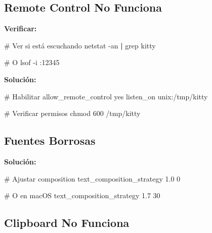 \documentclass[
  doc,
  floatsintext,
  longtable,
  a4paper,
  nolmodern,
  notxfonts,
  notimes,
  12pt,
  colorlinks=true,linkcolor=blue,citecolor=blue,urlcolor=blue]{apa7}
\newenvironment{Shaded}{\begin{snugshade}}{\end{snugshade}}
\newcommand{\AttributeTok}[1]{\textcolor[rgb]{0.40,0.45,0.13}{#1}}
\newcommand{\CommentTok}[1]{\textcolor[rgb]{0.37,0.37,0.37}{#1}}
\newcommand{\DataTypeTok}[1]{\textcolor[rgb]{0.68,0.00,0.00}{#1}}
\newcommand{\ErrorTok}[1]{\textcolor[rgb]{0.68,0.00,0.00}{#1}}
\newcommand{\ExtensionTok}[1]{\textcolor[rgb]{0.00,0.23,0.31}{#1}}
\newcommand{\FunctionTok}[1]{\textcolor[rgb]{0.28,0.35,0.67}{#1}}
\newcommand{\KeywordTok}[1]{\textcolor[rgb]{0.00,0.23,0.31}{\textbf{#1}}}
\newcommand{\NormalTok}[1]{\textcolor[rgb]{0.00,0.23,0.31}{#1}}
\begin{document}
\subsection{Remote Control No
Funciona}\label{remote-control-no-funciona}

\textbf{Verificar:}

\begin{Shaded}
\begin{Highlighting}[]
\CommentTok{\# Ver si está escuchando}
\FunctionTok{netstat} \AttributeTok{{-}an} \KeywordTok{|} \FunctionTok{grep}\NormalTok{ kitty}

\CommentTok{\# O}
\ExtensionTok{lsof} \AttributeTok{{-}i}\NormalTok{ :12345}
\end{Highlighting}
\end{Shaded}

\textbf{Solución:}

\begin{Shaded}
\begin{Highlighting}[]
\CommentTok{\# Habilitar}
\DataTypeTok{allow\_remote\_control} \DataTypeTok{yes}
\DataTypeTok{listen\_on} \DataTypeTok{unix}\ErrorTok{:/}\DataTypeTok{tmp}\ErrorTok{/}\DataTypeTok{kitty}

\CommentTok{\# Verificar permisos}
\DataTypeTok{chmod} \DataTypeTok{600} \ErrorTok{/}\DataTypeTok{tmp}\ErrorTok{/}\DataTypeTok{kitty}
\end{Highlighting}
\end{Shaded}

\subsection{Fuentes Borrosas}\label{fuentes-borrosas}

\textbf{Solución:}

\begin{Shaded}
\begin{Highlighting}[]
\CommentTok{\# Ajustar composition}
\DataTypeTok{text\_composition\_strategy} \DataTypeTok{1.0} \DataTypeTok{0}

\CommentTok{\# O en macOS}
\DataTypeTok{text\_composition\_strategy} \DataTypeTok{1.7} \DataTypeTok{30}
\end{Highlighting}
\end{Shaded}

\subsection{Clipboard No Funciona}\label{clipboard-no-funciona}
\end{document}
